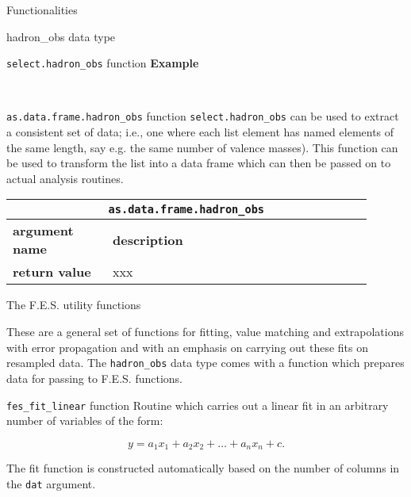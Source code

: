 \documentclass[10pt,a4paper]{article}
\begin{document}
\begin{section}{Functionalities}
\begin{subsection}{{\ttfamily hadron\_obs} data type}
\begin{subsubsection}{{\tt select.hadron\_obs} function}
\textbf{Example}

\

\end{subsubsection}

\begin{subsubsection}{ {\tt as.data.frame.hadron\_obs} function }
{\tt select.hadron\_obs} can be used to extract a consistent set of data; i.e., one where each list element has named elements of the same length, say e.g. the same number of valence masses).
This function can be used to transform the list into a data frame which can then be passed on to actual analysis routines.

{ \centering
\begin{tabular}{|p{0.25\linewidth}|p{0.65\linewidth}|}
\hline
\multicolumn{2}{|c|}{ {\tt as.data.frame.hadron\_obs} } \\
\hline \hline \textbf{argument name} & \textbf{description} \\ \hline
\hline 
\textbf{return value} & xxx \\
\hline
\end{tabular}
} %

\end{subsubsection}

\end{subsection} %

\begin{subsection}{The F.E.S. utility functions}

These are a general set of functions for fitting, value matching and extrapolations with error propagation and with an emphasis on carrying out these fits on resampled data.
The {\tt hadron\_obs} data type comes with a function which prepares data for passing to F.E.S. functions. 

\begin{subsubsection}{ {\tt fes\_fit\_linear} function }
Routine which carries out a linear fit in an arbitrary number of variables of the form:

\begin{equation}
y=a_1 x_1 + a_2 x_2 + \ldots + a_n x_n + c.
\end{equation}

The fit function is constructed automatically based on the number of columns in the {\tt dat} argument.


\end{subsubsection}
\end{subsection}
\end{section}
\end{document}
